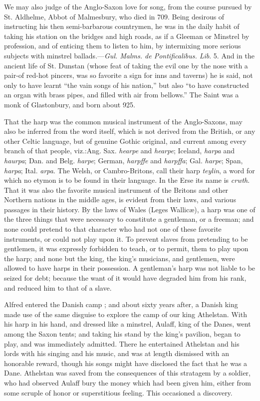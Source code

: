 We may also judge of the Anglo-Saxon love for song, from the course pursued
by St. Aldhelme, Abbot of Malmesbury, who died in 709. Being desirous of
instructing his then semi-barbarous countrymen, he was in the daily habit of
taking his station on the bridges and high roads, as if a Gleeman or Minstrel
by profession, and of enticing them to listen to him, by intermixing more serious
subjects with minstrel ballads.—\textit{Gul. Malms. de Pontificalibus. Lib}. 5. And
in the ancient life of St. Dunstan (whose feat of taking the evil one by the nose
with a pair-of red-hot pincers, was so favorite a sign for inns and taverns) he is
said, not only to have learnt “the vain songs of his nation,” but also “to have
constructed an organ with brass pipes, and filled with air from bellows.”
The Saint was a monk of Glastonbury, and born about 925.



That the harp was the common musical instrument of the Anglo-Saxons, may
also be inferred from the word itself, which is not derived from the British, or 
any other Celtic language, but of genuine \pagebreak
Gothic original, and current among 
every branch of that people, viz.:Ang. Sax. \textit{hearpe} and \textit{hearpe}; Iceland, \textit{harpa} 
and \textit{haurpa}; Dan. and Belg. \textit{harpe}; German, \textit{harpffe} and \textit{harpffa}; Gal. \textit{harpe};
Span, \textit{harpa}; Ital. \textit{arpa}. The Welsh, or Cambro-Britons, call their harp \textit{teylin},
a word for which no etymon is to be found in their language. In the Erse its
name is \textit{crwth}. That it was also the favorite musical instrument of the Britons
and other Northern nations in the middle ages, is evident from their laws,
and various passages in their history. By the laws of Wales (Leges Wallicæ), a
harp was one of the three things that were necessary to constitute a gentleman,
or a freeman; and none could pretend to that character who had not one of these
favorite instruments, or could not play upon it. To prevent slaves from pretending
to be gentlemen, it was expressly forbidden to teach, or to permit, them
to play upon the harp; and none but the king, the king’s musicians, and
gentlemen, were allowed to have harps in their possession. A gentleman’s harp
was not liable to be seized for debt; because the want of it would have degraded
him from his rank, and reduced him to that of a slave.

Alfred entered the Danish camp ; and about sixty years after, a
Danish king made use of the same disguise to explore the camp of our king
Athelstan. With his harp in his hand, and dressed like a minstrel, Aulaff, king
of the Danes, went among the Saxon tents; and taking his stand by the king’s
pavilion, began to play, and was immediately admitted. There he entertained
Athelstan and his lords with his singing and his music, and was at length dismissed
with an honorable reward, though his songs might have disclosed the fact
that he was a Dane. Athelstan was saved from the consequences of this stratagem
by a soldier, who had observed Aulaff bury the money which had been given him,
either from some scruple of honor or superstitious feeling. This occasioned
a discovery.

